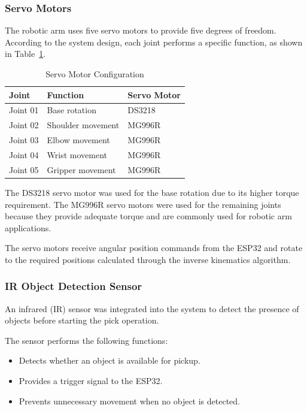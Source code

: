 \subsubsection{Servo Motors}

The robotic arm uses five servo motors to provide five degrees of freedom. According to the system design, each joint performs a specific function, as shown in Table~\ref{tab:servo_configuration}.

\begin{table}[htbp]
\centering
\caption{Servo Motor Configuration}
\label{tab:servo_configuration}
\begin{tabular}{lll}
\toprule
\textbf{Joint} & \textbf{Function} & \textbf{Servo Motor} \\
\midrule
Joint 01 & Base rotation & DS3218 \\
Joint 02 & Shoulder movement & MG996R \\
Joint 03 & Elbow movement & MG996R \\
Joint 04 & Wrist movement & MG996R \\
Joint 05 & Gripper movement & MG996R \\
\bottomrule
\end{tabular}
\end{table}

The DS3218 servo motor was used for the base rotation due to its higher torque requirement. The MG996R servo motors were used for the remaining joints because they provide adequate torque and are commonly used for robotic arm applications.

The servo motors receive angular position commands from the ESP32 and rotate to the required positions calculated through the inverse kinematics algorithm.

\subsubsection{IR Object Detection Sensor}

An infrared (IR) sensor was integrated into the system to detect the presence of objects before starting the pick operation.

The sensor performs the following functions:

\begin{itemize}
    \item Detects whether an object is available for pickup.
    \item Provides a trigger signal to the ESP32.
    \item Prevents unnecessary movement when no object is detected.
\end{itemize}

